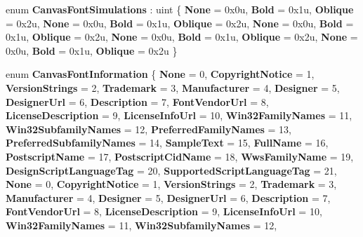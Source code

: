 \begin{DoxyCompactItemize}
enum {\bfseries Canvas\+Font\+Simulations} \+: uint \{ \newline
{\bfseries None} = 0x0u, 
{\bfseries Bold} = 0x1u, 
{\bfseries Oblique} = 0x2u, 
{\bfseries None} = 0x0u, 
\newline
{\bfseries Bold} = 0x1u, 
{\bfseries Oblique} = 0x2u, 
{\bfseries None} = 0x0u, 
{\bfseries Bold} = 0x1u, 
\newline
{\bfseries Oblique} = 0x2u, 
{\bfseries None} = 0x0u, 
{\bfseries Bold} = 0x1u, 
{\bfseries Oblique} = 0x2u, 
\newline
{\bfseries None} = 0x0u, 
{\bfseries Bold} = 0x1u, 
{\bfseries Oblique} = 0x2u
 \}
\item 
\mbox{\label{namespace_microsoft_1_1_graphics_1_1_canvas_1_1_text_a73fd564ee5399477f9a464ec4ba43d40}} 
enum {\bfseries Canvas\+Font\+Information} \{ \newline
{\bfseries None} = 0, 
{\bfseries Copyright\+Notice} = 1, 
{\bfseries Version\+Strings} = 2, 
{\bfseries Trademark} = 3, 
\newline
{\bfseries Manufacturer} = 4, 
{\bfseries Designer} = 5, 
{\bfseries Designer\+Url} = 6, 
{\bfseries Description} = 7, 
\newline
{\bfseries Font\+Vendor\+Url} = 8, 
{\bfseries License\+Description} = 9, 
{\bfseries License\+Info\+Url} = 10, 
{\bfseries Win32\+Family\+Names} = 11, 
\newline
{\bfseries Win32\+Subfamily\+Names} = 12, 
{\bfseries Preferred\+Family\+Names} = 13, 
{\bfseries Preferred\+Subfamily\+Names} = 14, 
{\bfseries Sample\+Text} = 15, 
\newline
{\bfseries Full\+Name} = 16, 
{\bfseries Postscript\+Name} = 17, 
{\bfseries Postscript\+Cid\+Name} = 18, 
{\bfseries Wws\+Family\+Name} = 19, 
\newline
{\bfseries Design\+Script\+Language\+Tag} = 20, 
{\bfseries Supported\+Script\+Language\+Tag} = 21, 
{\bfseries None} = 0, 
{\bfseries Copyright\+Notice} = 1, 
\newline
{\bfseries Version\+Strings} = 2, 
{\bfseries Trademark} = 3, 
{\bfseries Manufacturer} = 4, 
{\bfseries Designer} = 5, 
\newline
{\bfseries Designer\+Url} = 6, 
{\bfseries Description} = 7, 
{\bfseries Font\+Vendor\+Url} = 8, 
{\bfseries License\+Description} = 9, 
\newline
{\bfseries License\+Info\+Url} = 10, 
{\bfseries Win32\+Family\+Names} = 11, 
{\bfseries Win32\+Subfamily\+Names} = 12, 

\end{DoxyCompactItemize}
